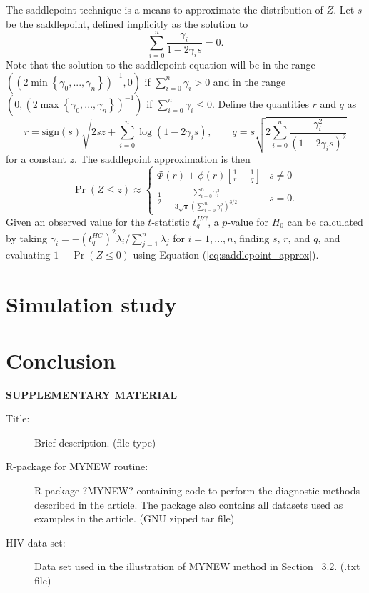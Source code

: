 \documentclass[12pt]{article}\usepackage[]{graphicx}\usepackage[]{color}
\begin{document}
The saddlepoint technique is a means to approximate the distribution of $Z$. Let $s$ be the saddlepoint, defined implicitly as the solution to \[
\sum_{i=0}^n \frac{\gamma_i}{1 - 2 \gamma_i s} = 0. \]
Note that the solution to the saddlepoint equation will be in the range $\left(\left(2 \min\left\{\gamma_0,...,\gamma_n\right\}\right)^{-1}, 0 \right)$ if $\sum_{i=0}^n \gamma_i > 0$ and in the range $\left(0, \left(2 \max\left\{\gamma_0,...,\gamma_n\right\}\right)^{-1}\right)$ if $\sum_{i=0}^n \gamma_i \leq 0$. Define the quantities $r$ and $q$ as \[
r = \text{sign}(s)\sqrt{2sz + \sum_{i=0}^n \log\left(1 - 2\gamma_i s\right)}, \qquad q = s \sqrt{2 \sum_{i=0}^n \frac{\gamma_i^2}{\left(1 - 2 \gamma_i s\right)^2}} \]
for a constant $z$. The saddlepoint approximation is then 
\begin{equation}
\label{eq:saddlepoint_approx}
\Pr(Z \leq z) \approx \begin{cases}\Phi(r) + \phi(r)\left[\frac{1}{r} - \frac{1}{q}\right] & s \neq 0 \\
\frac{1}{2} + \frac{\sum_{i=0}^n \gamma_i^3}{3 \sqrt\pi \left(\sum_{i=0}^n \gamma_i^2\right)^{3/2}} & s = 0. \end{cases}
\end{equation}
Given an observed value for the $t$-statistic $t^{HC}_q$, a $p$-value for $H_0$ can be calculated by taking $\gamma_i = -\left(t^{HC}_q\right)^2 \lambda_i / \sum_{j=1}^n \lambda_j$ for $i = 1,...,n$, finding $s$, $r$, and $q$, and evaluating $1 - \Pr(Z \leq 0)$ using Equation (\ref{eq:saddlepoint_approx}).

\section{Simulation study}
\label{sec:verify}

\section{Conclusion}
\label{sec:conc}


\newpage
\begin{center}
{\large\bf SUPPLEMENTARY MATERIAL}
\end{center}

\begin{description}

\item[Title:] Brief description. (file type)

\item[R-package for  MYNEW routine:] R-package ?MYNEW? containing code to perform the diagnostic methods described in the article. The package also contains all datasets used as examples in the article. (GNU zipped tar file)

\item[HIV data set:] Data set used in the illustration of MYNEW method in Section~ 3.2. (.txt file)

\end{description}



\end{document}
